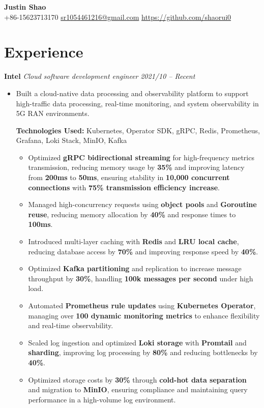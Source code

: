 \documentclass[a4paper,10pt]{article}
\begin{document}
\begin{center}
    \textbf{\Huge Justin Shao} \\[0.5em]
    +86-15623713170 \textbar \href{mailto:sr1054461216@gmail.com}{sr1054461216@gmail.com} \textbar \href{https://github.com/shaorui0}{https://github.com/shaorui0}
\end{center}

\section*{Experience}

\noindent\textbf{Intel} \hfill \textit{Cloud software development engineer} \hfill \textit{2021/10 -- Recent}
\begin{itemize}[leftmargin=*,noitemsep]

    \item Built a cloud-native data processing and observability platform to support high-traffic data processing, real-time monitoring, and system observability in 5G RAN environments.

    \textbf{Technologies Used:} Kubernetes, Operator SDK, gRPC, Redis, Prometheus, Grafana, Loki Stack, MinIO, Kafka
    \begin{itemize}[noitemsep]
        \item Optimized \textbf{gRPC bidirectional streaming} for high-frequency metrics transmission, reducing memory usage by \textbf{35\%} and improving latency from \textbf{200ms} to \textbf{50ms}, ensuring stability in \textbf{10,000 concurrent connections} with \textbf{75\% transmission efficiency increase}.
        \item Managed high-concurrency requests using \textbf{object pools} and \textbf{Goroutine reuse}, reducing memory allocation by \textbf{40\%} and response times to \textbf{100ms}.
        \item Introduced multi-layer caching with \textbf{Redis} and \textbf{LRU local cache}, reducing database access by \textbf{70\%} and improving response speed by \textbf{40\%}.
        \item Optimized \textbf{Kafka partitioning} and replication to increase message throughput by \textbf{30\%}, handling \textbf{100k messages per second} under high load.
        \item Automated \textbf{Prometheus rule updates} using \textbf{Kubernetes Operator}, managing over \textbf{100 dynamic monitoring metrics} to enhance flexibility and real-time observability.
        \item Scaled log ingestion and optimized \textbf{Loki storage} with \textbf{Promtail} and \textbf{sharding}, improving log processing by \textbf{80\%} and reducing bottlenecks by \textbf{40\%}.
        \item Optimized storage costs by \textbf{30\%} through \textbf{cold-hot data separation} and migration to \textbf{MinIO}, ensuring compliance and maintaining query performance in a high-volume log environment.
    \end{itemize}


\end{itemize}
\end{document}
